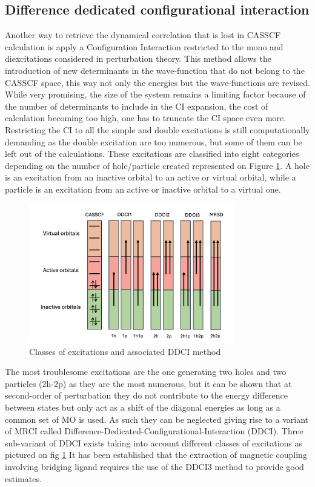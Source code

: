 \documentclass[12pt]{report}
\numberwithin{equation}{section}
\begin{document}
\subsection{Difference dedicated configurational interaction}
Another way to retrieve the dynamical correlation that is lost in CASSCF calculation is apply a Configuration Interaction restricted to the mono and diexcitations considered in perturbation theory.
This method allows the introduction of new determinants in the wave-function that do not belong to the CASSCF space, this way not only the energies but the wave-functions are revised.
While very promising, the size of the system remains a limiting factor because of the number of determinants to include in the CI expansion, the cost of calculation becoming too high, one has to truncate the CI space even more.
Restricting the CI to all the simple and double excitations is still computationally demanding as the double excitation are too numerous, but some of them can be left out of the calculations. 
These excitations are classified into eight categories depending on the number of hole/particle created represented on Figure \ref{DDCI}. 
A hole is an excitation from an inactive orbital to an active or virtual orbital, while a particle is an excitation from an active or inactive orbital to a virtual one.

\begin{figure}
    \centering
    \includegraphics[width=0.8\textwidth]{Images/DDCI.png}
    \caption{Classes of excitations and associated DDCI method}
    \label{DDCI}
\end{figure}
The most troublesome excitations are the one generating two holes and two particles (2h-2p) as they are the most numerous, but it can be shown that at second-order of perturbation they do not contribute to the energy difference between states but only act as a shift of the diagonal energies as long as a common set of MO is used.
As such they can be neglected giving rise to a variant of MRCI called Difference-Dedicated-Configurational-Interaction (DDCI). 
Three sub-variant of DDCI exists taking into account different classes of excitations as pictured on fig \ref{DDCI}
It has been established that the extraction of magnetic coupling involving bridging ligand requires the use of the DDCI3 method to provide good estimates.
\end{document}
